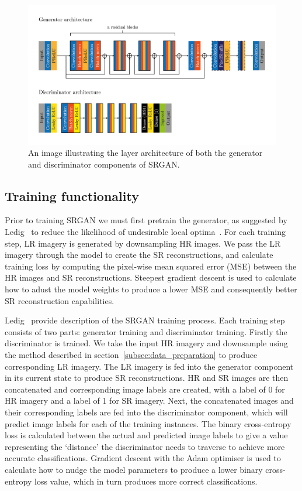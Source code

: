 \begin{figure}
    \includegraphics[width=\linewidth]{./assets/srgan_architecture.png}
    \caption{An image illustrating the layer architecture of both the generator and discriminator components of SRGAN.}
    \label{fig:srgan_architecture}
\end{figure}

\subsection{Training functionality}\label{subsec:training_functionality}
Prior to training SRGAN we must first pretrain the generator, as suggested by Ledig \etal\ to reduce the likelihood of undesirable local optima~\cite{srgan}. For each training step, LR imagery is generated by downsampling HR images. We pass the LR imagery through the model to create the SR reconstructions, and calculate training loss by computing the pixel-wise mean squared error (MSE) between the HR images and SR reconstructions. Steepest gradient descent is used to calculate how to adust the model weights to produce a lower MSE and consequently better SR reconstruction capabilities.

Ledig \etal\ provide description of the SRGAN training process. Each training step consists of two parts: generator training and discriminator training. Firstly the discriminator is trained. We take the input HR imagery and downsample using the method described in section~\ref{subsec:data_preparation} to produce corresponding LR imagery. The LR imagery is fed into the generator component in its current state to produce SR reconstructions. HR and SR images are then concatenated and corresponding image labels are created, with a label of 0 for HR imagery and a label of 1 for SR imagery. Next, the concatenated images and their corresponding labels are fed into the discriminator component, which will predict image labels for each of the training instances. The binary cross-entropy loss is calculated between the actual and predicted image labels to give a value representing the `distance' the discriminator needs to traverse to achieve more accurate classifications. Gradient descent with the Adam optimiser is used to calculate how to nudge the model parameters to produce a lower binary cross-entropy loss value, which in turn produces more correct classifications.

